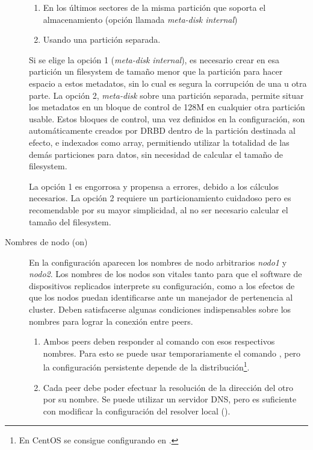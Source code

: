 \begin{description}
\begin{enumerate}
	\item En los últimos sectores de la misma partición que soporta el almacenamiento (opción llamada \textit{meta-disk internal})
	\item Usando una partición separada. 
\end{enumerate}

Si se elige la opción 1 (\textit{meta-disk internal}), es necesario crear en esa partición un filesystem de tamaño menor que la partición para hacer espacio a estos metadatos, sin lo cual es segura la corrupción de una u otra parte. 
La opción 2, \textit{meta-disk} sobre una partición separada, permite situar los metadatos en un bloque de control de 128M en cualquier otra partición usable. Estos bloques de control, una vez definidos en la configuración, son automáticamente creados por DRBD dentro de la partición destinada al efecto, e indexados como array, permitiendo utilizar la totalidad de las demás particiones para datos, sin necesidad de calcular el tamaño de filesystem. 

La opción 1 es engorrosa y propensa a errores, debido a los cálculos necesarios. La opción 2 requiere un particionamiento cuidadoso pero es recomendable por su mayor simplicidad, al no ser necesario calcular el tamaño del filesystem. 


\item [Nombres de nodo (on)]
En la configuración aparecen los nombres de nodo arbitrarios \textit{nodo1} y \textit{nodo2}. Los nombres de los nodos son vitales tanto para que el software de dispositivos replicados interprete su configuración, como a los efectos de que los nodos puedan identificarse ante un manejador de pertenencia al cluster. Deben satisfacerse algunas condiciones indispensables sobre los nombres para lograr la conexión entre peers. 

\begin{enumerate}
	\item Ambos peers deben responder al comando  con esos respectivos nombres.  Para esto se puede usar temporariamente el comando , pero la configuración persistente depende de la distribución\footnote{En CentOS se consigue configurando  en .}.
	\item Cada peer debe poder efectuar la resolución de la dirección del otro por su nombre. Se puede utilizar un servidor DNS, pero es suficiente con modificar la configuración del resolver local ().
\end{enumerate}


\end{description}
